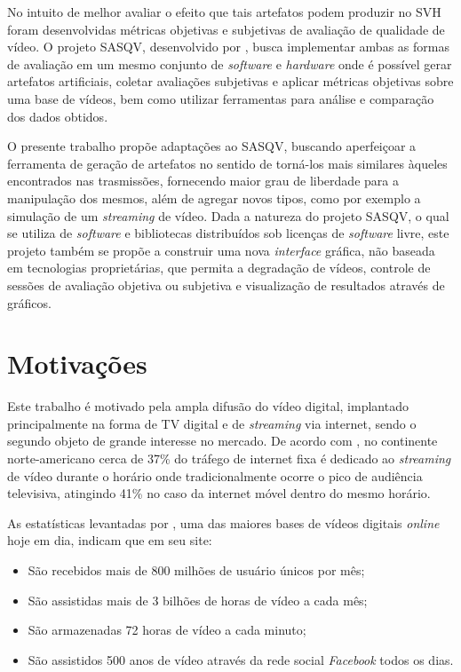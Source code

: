 No intuito de melhor avaliar o efeito que tais artefatos podem produzir no SVH foram desenvolvidas métricas objetivas e subjetivas de avaliação de qualidade de vídeo. O projeto SASQV, desenvolvido por \cite{sasqv}, busca implementar ambas as formas de avaliação em um mesmo conjunto de \emph{software} e \emph{hardware} onde é possível gerar artefatos artificiais, coletar avaliações subjetivas e aplicar métricas objetivas sobre uma base de vídeos, bem como utilizar ferramentas para análise e comparação dos dados obtidos.

O presente trabalho propõe adaptações ao SASQV, buscando aperfeiçoar a ferramenta de geração de artefatos no sentido de torná-los mais similares àqueles encontrados nas trasmissões, fornecendo maior grau de liberdade para a manipulação dos mesmos, além de agregar novos tipos, como por exemplo a simulação de um \emph{streaming} de vídeo. Dada a natureza do projeto SASQV, o qual se utiliza de \emph{software} e bibliotecas distribuídos sob licenças de \emph{software} livre, este projeto também se propõe a construir uma nova \emph{interface} gráfica, não baseada em tecnologias proprietárias, que permita a degradação de vídeos, controle de sessões de avaliação objetiva ou subjetiva e visualização de resultados através de gráficos.

\section{Motivações}

Este trabalho é motivado pela ampla difusão do vídeo digital, implantado principalmente na forma de TV digital e de \emph{streaming} via internet, sendo o segundo objeto de grande interesse no mercado. De acordo com \cite{sandvinereport}, no continente norte-americano cerca de 37\% do tráfego de internet fixa é dedicado ao \emph{streaming} de vídeo durante o horário onde tradicionalmente ocorre o pico de audiência televisiva, atingindo 41\% no caso da internet móvel dentro do mesmo horário.

As estatísticas levantadas por \cite{statsyoutube}, uma das maiores bases de vídeos digitais \emph{online} hoje em dia, indicam que em seu site:
\begin{itemize}
    \item São recebidos mais de 800 milhões de usuário únicos por mês;
    \item São assistidas mais de 3 bilhões de horas de vídeo a cada mês;
    \item São armazenadas 72 horas de vídeo a cada minuto;
    \item São assistidos 500 anos de vídeo através da rede social \emph{Facebook} todos os dias.
\end{itemize}

